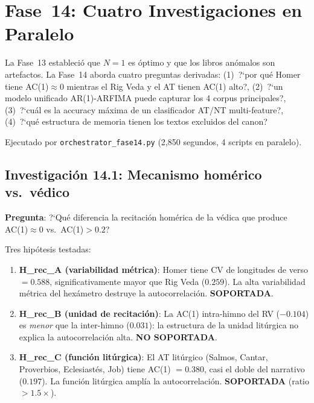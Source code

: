 \documentclass[12pt,a4paper]{article}
\begin{document}
\section{Fase~14: Cuatro Investigaciones en Paralelo}

La Fase~13 estableci\'o que $N = 1$ es \'optimo y que los libros an\'omalos son artefactos.
La Fase~14 aborda cuatro preguntas derivadas: (1)~?`por qu\'e Homer tiene AC(1)$\approx 0$
mientras el Rig Veda y el AT tienen AC(1) alto?, (2)~?`un modelo unificado AR(1)-ARFIMA
puede capturar los 4 corpus principales?, (3)~?`cu\'al es la accuracy m\'axima de un
clasificador AT/NT multi-feature?, (4)~?`qu\'e estructura de memoria tienen los textos
excluidos del canon?

Ejecutado por \texttt{orchestrator\_fase14.py} (2,850 segundos, 4 scripts en paralelo).

\subsection{Investigaci\'on 14.1: Mecanismo hom\'erico vs.\ v\'edico}

\textbf{Pregunta}: ?`Qu\'e diferencia la recitaci\'on hom\'erica de la v\'edica que produce
AC(1)$\approx 0$ vs.\ AC(1)$> 0.2$?

Tres hip\'otesis testadas:
\begin{enumerate}[leftmargin=2em]
\item \textbf{H\_rec\_A (variabilidad m\'etrica)}: Homer tiene CV de longitudes de verso
      $= 0.588$, significativamente mayor que Rig Veda ($0.259$). La alta variabilidad
      m\'etrica del hex\'ametro destruye la autocorrelaci\'on. \textbf{SOPORTADA}.
\item \textbf{H\_rec\_B (unidad de recitaci\'on)}: La AC(1) intra-himno del RV
      ($-0.104$) es \emph{menor} que la inter-himno ($0.031$): la estructura
      de la unidad lit\'urgica no explica la autocorrelaci\'on alta. \textbf{NO SOPORTADA}.
\item \textbf{H\_rec\_C (funci\'on lit\'urgica)}: El AT lit\'urgico (Salmos, Cantar,
      Proverbios, Eclesiast\'es, Job) tiene AC(1) $= 0.380$, casi el doble del
      narrativo ($0.197$). La funci\'on lit\'urgica ampl\'ia la autocorrelaci\'on.
      \textbf{SOPORTADA} (ratio $> 1.5\times$).
\end{enumerate}
\end{document}
